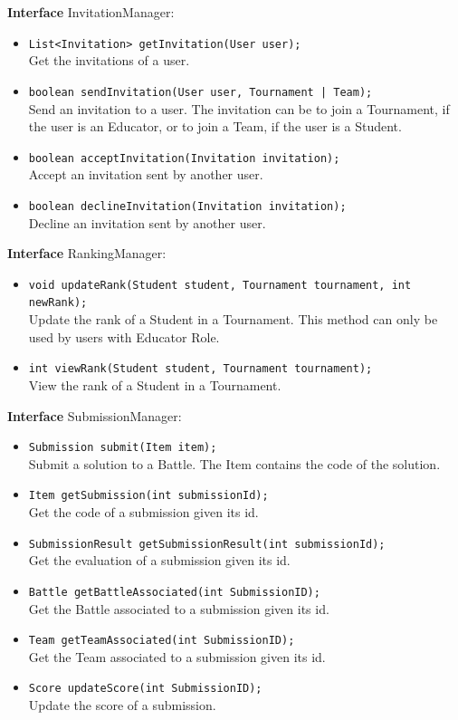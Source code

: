 \textbf{Interface} InvitationManager:
\begin{itemize}
    \item \texttt{List<Invitation> getInvitation(User user);}
    \\ Get the invitations of a user.
    \item \texttt{boolean sendInvitation(User user, Tournament | Team);}
    \\ Send an invitation to a user. The invitation can be to join a Tournament, if the user is an Educator, or to join a Team, if the user is a Student.
    \item \texttt{boolean acceptInvitation(Invitation invitation);}
    \\ Accept an invitation sent by another user.
    \item \texttt{boolean declineInvitation(Invitation invitation);}
    \\ Decline an invitation sent by another user.
\end{itemize}

\textbf{Interface} RankingManager:
\begin{itemize}
    \item \texttt{void updateRank(Student student, Tournament tournament, int newRank);}
    \\ Update the rank of a Student in a Tournament. This method can only be used by users with Educator Role.
    \item \texttt{int viewRank(Student student, Tournament tournament);}
    \\ View the rank of a Student in a Tournament.
\end{itemize}

\textbf{Interface} SubmissionManager:
\begin{itemize}
    \item \texttt{Submission submit(Item item);}
    \\ Submit a solution to a Battle. The Item contains the code of the solution.
    \item \texttt{Item getSubmission(int submissionId);}
    \\ Get the code of a submission given its id.
    \item \texttt{SubmissionResult getSubmissionResult(int submissionId);}
    \\ Get the evaluation of a submission given its id.
    \item \texttt{Battle getBattleAssociated(int SubmissionID);}
    \\ Get the Battle associated to a submission given its id.
    \item \texttt{Team getTeamAssociated(int SubmissionID);}
    \\ Get the Team associated to a submission given its id.
    \item \texttt{Score updateScore(int SubmissionID);}
    \\ Update the score of a submission.
\end{itemize}

